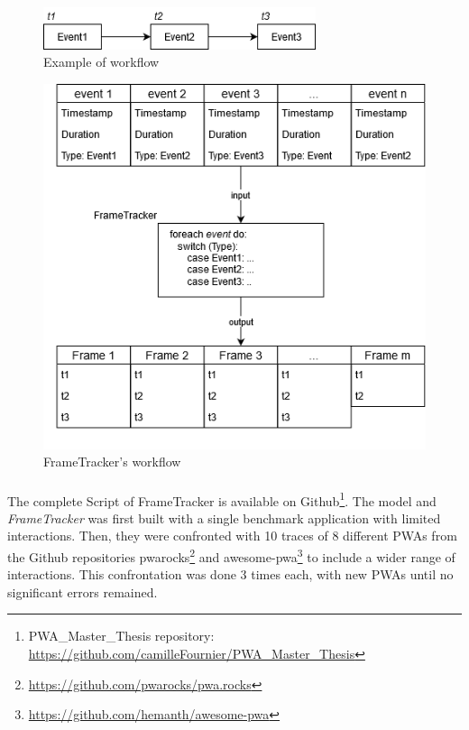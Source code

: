 \documentclass{kththesis}
\begin{document}
    \begin{figure}
        \centering
        \includegraphics[width=8cm]{kththesis/Figures/chrome_model_example.png}
        \caption{Example of workflow}
        \label{fig:model_example}
    \end{figure}
    
    \begin{figure}
        \centering
        \includegraphics[width=13cm]{kththesis/Figures/frametracker_example.png}
        \caption{FrameTracker's workflow}
        \label{fig:frametracker_example}
    \end{figure}
    
    
    \paragraph{}
    The complete Script of FrameTracker is available on Github\footnote{PWA\_Master\_Thesis repository: \url{https://github.com/camilleFournier/PWA_Master_Thesis}}.
    The model and \textit{FrameTracker} was first built with a single benchmark application with limited interactions. Then, they were confronted with 10 traces of 8 different PWAs from the Github repositories pwarocks\footnote{\url{https://github.com/pwarocks/pwa.rocks}} and awesome-pwa\footnote{\url{https://github.com/hemanth/awesome-pwa}} to include a wider range of interactions. This confrontation was done 3 times each, with new PWAs until no significant errors remained.
    
\end{document}
